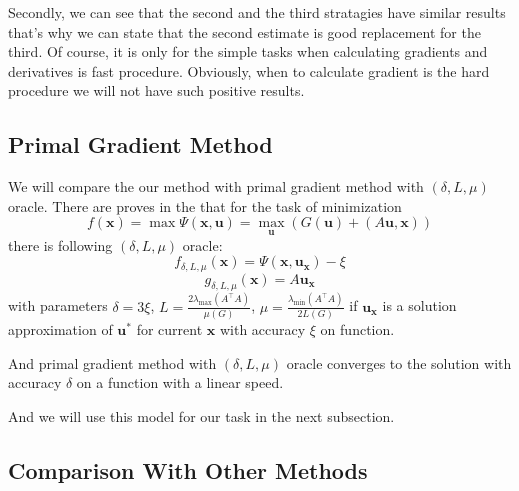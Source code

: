 \documentclass[12pt]{article}
\begin{document}
Secondly, we can see that the second and the third stratagies have similar results that's why we can state that the second estimate is good replacement for the third. Of course, it is only for the simple tasks when calculating gradients and derivatives is fast procedure. Obviously, when to calculate gradient is the hard procedure we will not have such positive results.

\subsection{Primal Gradient Method}
\label{PGM}

We will compare the our method with primal gradient method with $(\delta, L,\mu)$ oracle. There are proves in the \cite{PGM} that for the task of minimization 
$$f(\textbf{x}) = \max \Psi(\textbf{x}, \textbf{u}) =\max_\textbf{u}\left(G(\textbf{u})+(A\textbf{u}, \textbf{x})\right)$$
there is following $(\delta, L,\mu)$ oracle:
$$f_{\delta, L,\mu}(\textbf{x}) = \Psi(\textbf{x}, \textbf{u}_\textbf{x}) - \xi$$
$$g_{\delta, L,\mu}(\textbf{x}) = A\textbf{u}_\textbf{x}$$
with parameters $\delta = 3\xi$, $L = \frac{2\lambda_{\max}(A^\top A)}{\mu(G)}$, $\mu = \frac{\lambda_{\min}(A^\top A)}{2L(G)}$ if $\textbf{u}_\textbf{x}$ is a solution approximation of $\textbf{u}^*$ for current $\textbf{x}$ with accuracy $\xi$ on function.

And primal gradient method with $(\delta, L,\mu)$ oracle converges to the solution with accuracy $\delta$ on a function with a linear speed.

And we will use this model for our task in the next subsection.

\subsection{Comparison With Other Methods}
\label{Comparison}
\end{document}
